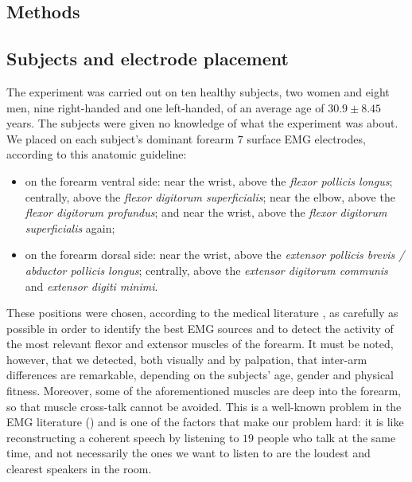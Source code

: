 \documentclass[10pt]{bmc_article}
\newenvironment{bmcformat}{\begin{raggedright}\baselineskip20pt\sloppy\setboolean{publ}{false}}{\end{raggedright}\baselineskip20pt\sloppy}
\begin{document}
\begin{bmcformat}
\section*{Methods}
\label{sec:m&ms}

\subsection*{Subjects and electrode placement}

The experiment was carried out on ten healthy subjects, two women and
eight men, nine right-handed and one left-handed, of an average age of
$30.9 \pm 8.45$ years. The subjects were given no knowledge of what
the experiment was about. We placed on each subject's dominant forearm
$7$ surface EMG electrodes, according to this anatomic guideline:

\begin{itemize}

  \item on the forearm ventral side: near the wrist, above the
    \emph{flexor pollicis longus}; centrally, above the \emph{flexor
    digitorum superficialis}; near the elbow, above the \emph{flexor
    digitorum profundus}; and near the wrist, above the \emph{flexor
    digitorum superficialis} again;

  \item on the forearm dorsal side: near the wrist, above the
    \emph{extensor pollicis brevis / abductor pollicis longus};
    centrally, above the \emph{extensor digitorum communis} and
    \emph{extensor digiti minimi}.

\end{itemize}

These positions were chosen, according to the medical literature
\cite{Kendall},
as carefully as possible in order to identify the best EMG sources and
to detect the activity of the most relevant flexor and extensor
muscles of the forearm. It must be noted, however, that we detected,
both visually and by palpation, that inter-arm differences are
remarkable, depending on the subjects' age, gender and physical
fitness. Moreover, some of the aforementioned muscles are deep into
the forearm, so that muscle cross-talk cannot be avoided. This is a
well-known problem in the EMG literature (\cite{deluca,zecca}) and is
one of the factors that make our problem hard: it is like
reconstructing a coherent speech by listening to $19$ people who talk
at the same time, and not necessarily the ones we want to listen to
are the loudest and clearest speakers in the room.


\end{bmcformat}
\end{document}
